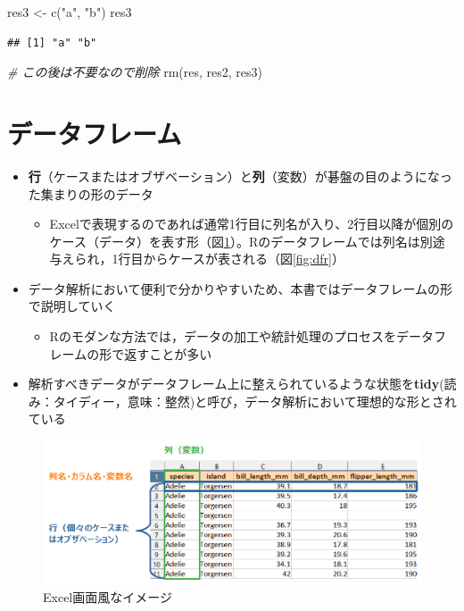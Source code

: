 \documentclass[
  xelatex,ja=standard, b5paper]{bxjsbook}
\newenvironment{Shaded}{\begin{snugshade}}{\end{snugshade}}
\newcommand{\CommentTok}[1]{\textcolor[rgb]{0.56,0.35,0.01}{\textit{#1}}}
\newcommand{\FunctionTok}[1]{\textcolor[rgb]{0.00,0.00,0.00}{#1}}
\newcommand{\NormalTok}[1]{#1}
\newcommand{\OtherTok}[1]{\textcolor[rgb]{0.56,0.35,0.01}{#1}}
\newcommand{\StringTok}[1]{\textcolor[rgb]{0.31,0.60,0.02}{#1}}
\providecommand{\tightlist}{%
  \setlength{\itemsep}{0pt}\setlength{\parskip}{0pt}}
\begin{document}
\begin{Shaded}
\begin{Highlighting}[]
\NormalTok{res3 }\OtherTok{\textless{}{-}} \FunctionTok{c}\NormalTok{(}\StringTok{"a"}\NormalTok{, }\StringTok{"b"}\NormalTok{)}
\NormalTok{res3}
\end{Highlighting}
\end{Shaded}

\begin{verbatim}
## [1] "a" "b"
\end{verbatim}

\begin{Shaded}
\begin{Highlighting}[]
\CommentTok{\# この後は不要なので削除}
\FunctionTok{rm}\NormalTok{(res, res2, res3)}
\end{Highlighting}
\end{Shaded}

\hypertarget{p-df}{%
\section{データフレーム}\label{p-df}}

\begin{itemize}
\tightlist
\item
  \textbf{行}（ケースまたはオブザベーション）と\textbf{列}（変数）が碁盤の目のようになった集まりの形のデータ

  \begin{itemize}
  \tightlist
  \item
    Excelで表現するのであれば通常1行目に列名が入り、2行目以降が個別のケース（データ）を表す形（図\ref{fig:dfxl}）。Rのデータフレームでは列名は別途与えられ，1行目からケースが表される（図\ref{fig:dfr}）
  \end{itemize}
\item
  データ解析において便利で分かりやすいため、本書ではデータフレームの形で説明していく

  \begin{itemize}
  \tightlist
  \item
    Rのモダンな方法では，データの加工や統計処理のプロセスをデータフレームの形で返すことが多い
  \end{itemize}
\item
  解析すべきデータがデータフレーム上に整えられているような状態を\textbf{tidy}(読み：タイディー，意味：整然)と呼び，データ解析において理想的な形とされている
\end{itemize}

\begin{figure}

{\centering \includegraphics[width=0.8\linewidth]{images/df_xl} 

}

\caption{Excel画面風なイメージ}\label{fig:dfxl}
\end{figure}
\end{document}
